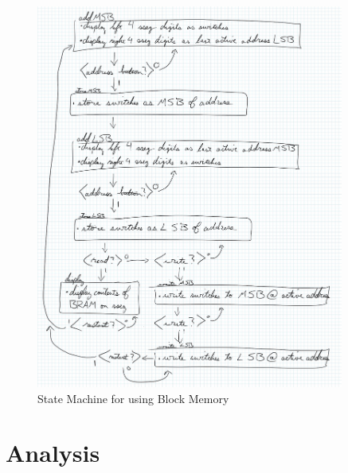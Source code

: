 \documentclass{article}
\begin{document}
\begin{figure}
\begin{center}
\caption{State Machine for using Block Memory}\label{fig:blockmemstatemachine}
\includegraphics[width=0.9\textwidth]{blockmemstatemachine.jpg}
\end{center}
\end{figure}
     
\section{Analysis}
%
%
\end{document}
